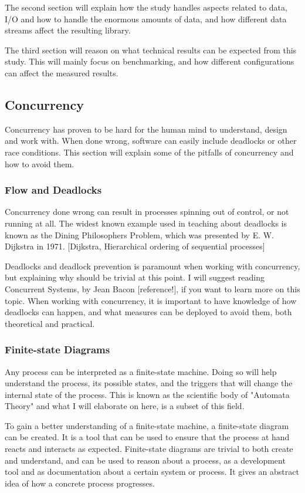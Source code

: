 \documentclass[a4paper]{article}
\begin{document}
The second section will explain how the study handles aspects related to data, I/O and how to handle the enormous amounts of data, and how different data streams affect the resulting library.

The third section will reason on what technical results can be expected from this study. This will mainly focus on benchmarking, and how different configurations can affect the measured results.



\subsection{Concurrency}
Concurrency has proven to be hard for the human mind to understand, design and work with. When done wrong, software can easily
include deadlocks or other race conditions. This section will explain some of the pitfalls of concurrency and how to avoid them.


\subsubsection{Flow and Deadlocks}
Concurrency done wrong can result in processes spinning out of control, or not running at all. The widest known example used in teaching about deadlocks is known as the Dining Philosophers Problem, which was presented by E. W. Dijkstra in 1971. [Dijkstra, Hierarchical ordering of sequential processes]

Deadlocks and deadlock prevention is paramount when working with concurrency, but explaining why should be trivial at this point. I will suggest reading Concurrent Systems, by Jean Bacon [reference!], if you want to learn more on this topic. When working with concurrency, it is important to have knowledge of how deadlocks can happen, and what measures can be deployed to avoid them, both theoretical and practical.


\subsubsection{Finite-state Diagrams}
Any process can be interpreted as a finite-state machine. Doing so will help understand the process, its possible states, and the triggers that will change the internal state of the process. This is known as the scientific body of "Automata Theory" and what I will elaborate on here, is a subset of this field.

To gain a better understanding of a finite-state machine, a finite-state diagram can be created. It is a tool that can be used to ensure that the process at hand reacts and interacts as expected. Finite-state diagrams are trivial to both create and understand, and can be used to reason about a process, as a development tool and as documentation about a certain system or process. It gives an abstract idea of how a concrete process progresses.\\
\end{document}
